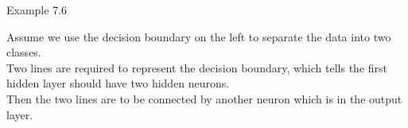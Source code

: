 \documentclass{book}
\begin{document}
\begin{egBox}{Example 7.6}{}
\begin{center}
\begin{minipage}{0.5\textwidth}
            \end{minipage}
        \end{center}
        Assume we use the decision boundary on the left to separate the data into two classes.\\
        Two lines are required to represent the decision boundary, which tells the first hidden layer should have two hidden neurons.\\
        Then the two lines are to be connected by another neuron which is in the output layer.
        \begin{center}
            \begin{minipage}{0.5\textwidth}
\end{minipage}
\end{center}
\end{egBox}
\end{document}
